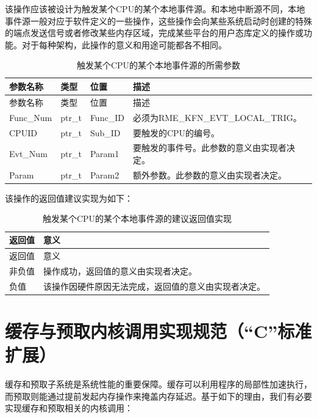 该操作应该被设计为触发某个CPU的某个本地事件源。和本地中断源不同，本地事件源一般对应于软件定义的一些操作，这些操作会向某些系统启动时创建的特殊的端点发送信号或者修改某些内存区域，完成某些平台的用户态库定义的操作或功能。对于每种架构，此操作的意义和用途可能都各不相同。

\begin{xltabular}{\textwidth}{@{}>{\hsize\raggedright\arraybackslash}X>{\hsize\raggedright\arraybackslash}X>{\hsize\raggedright\arraybackslash}X>{\hsize\raggedright\arraybackslash}X@{}}
\caption{触发某个CPU的某个本地事件源的所需参数}\label{tab:8-22-trigger-local-event-source-parameters}\\
\toprule
参数名称 & 类型 & 位置 & 描述\tabularnewline
\endfirsthead
\toprule
参数名称 & 类型 & 位置 & 描述\tabularnewline
\midrule
\endhead
\bottomrule
\endlastfoot
Func\_Num & ptr\_t & Func\_ID &
必须为RME\_KFN\_EVT\_LOCAL\_TRIG。\tabularnewline
CPUID & ptr\_t & Sub\_ID & 要触发的CPU的编号。\tabularnewline
Evt\_Num & ptr\_t & Param1 &
要触发的事件号。此参数的意义由实现者决定。\tabularnewline
Param & ptr\_t & Param2 &
额外参数。此参数的意义由实现者决定。\tabularnewline
\end{xltabular}

该操作的返回值建议实现为如下：

\begin{xltabular}{\textwidth}{@{}>{\hsize\raggedright\arraybackslash}X>{\hsize\raggedright\arraybackslash}X@{}}
\caption{触发某个CPU的某个本地事件源的建议返回值实现}\label{tab:8-23-trigger-local-event-source-suggested-return-values}\\
\toprule
返回值 & 意义\tabularnewline
\endfirsthead
\toprule
返回值 & 意义\tabularnewline
\midrule
\endhead
\bottomrule
\endlastfoot
    非负值 & 操作成功，返回值的意义由实现者决定。\tabularnewline
    负值 & 该操作因硬件原因无法完成，返回值的意义由实现者决定。\tabularnewline
\end{xltabular}

\section{缓存与预取内核调用实现规范（``C''标准扩展）}\label{sec:8-cache-and-prefetch-kernel-calls}

缓存和预取子系统是系统性能的重要保障。缓存可以利用程序的局部性加速执行，而预取则能通过提前发起内存操作来掩盖内存延迟。基于如下的理由，我们有必要实现缓存和预取相关的内核调用：

